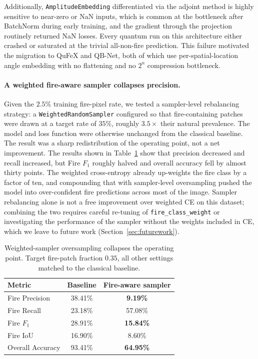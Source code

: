 \documentclass{article}
\begin{document}
Additionally, \texttt{AmplitudeEmbedding} differentiated via the adjoint method is highly sensitive to near-zero or NaN inputs, which is common at the bottleneck after BatchNorm during early training, and the gradient through the projection routinely returned NaN losses. Every quantum run on this architecture either crashed or saturated at the trivial all-non-fire prediction. This failure motivated the migration to QuFeX and QB-Net, both of which use per-spatial-location angle embedding with no flattening and no $2^n$ compression bottleneck.

\paragraph{A weighted fire-aware sampler collapses precision.}
Given the $2.5\%$ training fire-pixel rate, we tested a sampler-level rebalancing strategy: a \texttt{WeightedRandomSampler} configured so that fire-containing patches were drawn at a target rate of $35\%$, roughly $3.5\times$ their natural prevalence. The model and loss function were otherwise unchanged from the classical baseline. The result was a sharp redistribution of the operating point, not a net improvement. The results shown in Table~\ref{tab:sampler-fail} show that precision decreased and recall increased, but Fire $F_1$ roughly halved and overall accuracy fell by almost thirty points. The weighted cross-entropy already up-weights the fire class by a factor of ten, and compounding that with sampler-level oversampling pushed the model into over-confident fire predictions across most of the image. Sampler rebalancing alone is not a free improvement over weighted CE on this dataset; combining the two requires careful re-tuning of \texttt{fire\_class\_weight} or investigating the performance of the sampler without the weights included in CE, which we leave to future work (Section~\ref{sec:futurework}).

\begin{table}[H]
    \centering
    \begin{tabular}{lcc}
        \toprule
        Metric & Baseline & Fire-aware sampler \\
        \midrule
        Fire Precision   & 38.41\% & \textbf{9.19\%} \\
        Fire Recall      & 23.18\% & 57.08\% \\
        Fire $F_1$       & 28.91\% & \textbf{15.84\%} \\
        Fire IoU         & 16.90\% & 8.60\% \\
        Overall Accuracy & 93.41\% & \textbf{64.95\%} \\
        \bottomrule
    \end{tabular}
    \caption{Weighted-sampler oversampling collapses the operating point. Target fire-patch fraction $0.35$, all other settings matched to the classical baseline.}
    \label{tab:sampler-fail}
\end{table}
\end{document}
